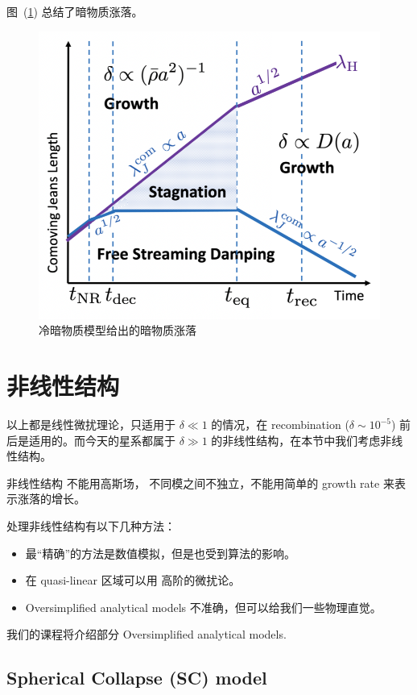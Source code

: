\documentclass[12pt]{ctexart}
\newcommand{\reffig}[1]{图~(\ref{#1})}
\begin{document}
\reffig{fig:CDM_pert} 总结了暗物质涨落。
\begin{figure}[!hbtp]
	\centering 
	\includegraphics[width=1.0\linewidth]{CDM_pertu.png}
	\caption{冷暗物质模型给出的暗物质涨落}
    \label{fig:CDM_pert}
\end{figure}

\section{非线性结构}
以上都是线性微扰理论，只适用于 $\delta \ll 1$ 的情况，在 recombination ($\delta\sim 10^{-5}$) 前后是适用的。而今天的星系都属于 $\delta \gg 1$ 的非线性结构，在本节中我们考虑非线性结构。

非线性结构 不能用高斯场，  不同模之间不独立，不能用简单的 growth rate 来表示涨落的增长。

处理非线性结构有以下几种方法：
\begin{itemize}
    \item 最“精确”的方法是数值模拟，但是也受到算法的影响。
    \item 在 quasi-linear 区域可以用 高阶的微扰论。
    \item Oversimplified analytical models 不准确，但可以给我们一些物理直觉。
\end{itemize}
我们的课程将介绍部分 Oversimplified analytical models.

\subsection{Spherical Collapse (SC) model}
\end{document}
